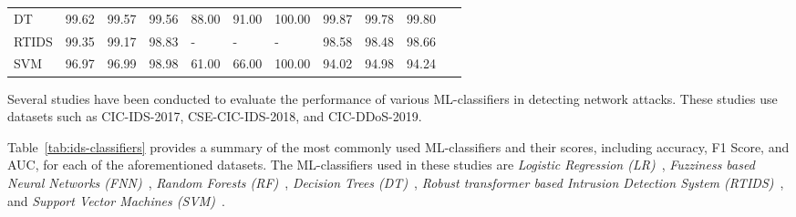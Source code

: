 \begin{table*}
{\begin{tabular}{@{}r|lll|lll|lll|r@{}}
            \multicolumn{1}{|l|}{DT}                   & 99.62                                      & 99.57                                          & 99.56                                       & 88.00             & 91.00             & 100.00       & 99.87             & 99.78             & 99.80        & \multicolumn{1}{l|}{~\cite{pujari2022comparative, cic2019models, huang2020igan, maseer2021benchmarking}}                                                                             \\
            \multicolumn{1}{|l|}{RTIDS}                & 99.35                                      & 99.17                                          & 98.83                                       & -                 & -                 & -            & 98.58             & 98.48             & 98.66        & \multicolumn{1}{l|}{~\cite{wu2022rtids}}                                                                             \\
            \multicolumn{1}{|l|}{SVM}                  & 96.97                                      & 96.99                                          & 98.98                                       & 61.00             & 66.00             & 100.00       & 94.02             & 94.98             & 94.24        & \multicolumn{1}{l|}{~\cite{pujari2022comparative, huang2020igan, maseer2021benchmarking, faker2019, wu2022rtids} }                                                                             \\ \bottomrule
        \end{tabular}
    }
    \caption{Performance of the \textit{IDSs} classifiers on the selected datasets.}
    \label{tab:ids-classifiers}
\end{table*}


Several studies have been conducted to evaluate the performance of various ML-classifiers in detecting network
attacks.
These studies use datasets such as CIC-IDS-2017, CSE-CIC-IDS-2018, and CIC-DDoS-2019.

Table~\ref{tab:ids-classifiers} provides a summary of the most commonly used ML-classifiers and
their scores, including accuracy, F1 Score, and AUC, for each of the aforementioned datasets.
The ML-classifiers used in these studies are \textit{Logistic Regression (LR)}~\cite{wright1995logistic},
\textit{Fuzziness based Neural Networks (FNN)}~\cite{ashfaq2017fuzziness},
\textit{Random Forests (RF)}~\cite{cutler2012random},
\textit{Decision Trees (DT)}~\cite{rokach2005decision},
\textit{Robust transformer based Intrusion Detection System (RTIDS)}~\cite{wu2022rtids},
and \textit{Support Vector Machines (SVM)}~\cite{suthaharan2016support}.

